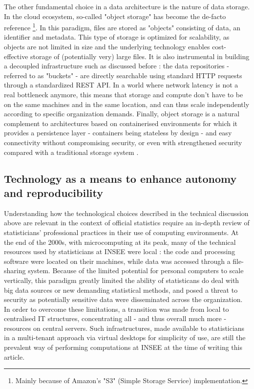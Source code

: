 
The other fundamental choice in a data architecture is the nature of data storage. In the cloud ecosystem, so-called "object storage" has become the de-facto reference \cite{samundiswary2017object} \footnote{Mainly because of Amazon's "S3" (Simple Storage Service) implementation.}. In this paradigm, files are stored as "objects" consisting of data, an identifier and metadata. This type of storage is optimized for scalability, as objects are not limited in size and the underlying technology enables cost-effective storage of (potentially very) large files. It is also instrumental in building a decoupled infrastructure such as discussed before : the data repositories - referred to as "buckets" - are directly searchable using standard HTTP requests through a standardized REST API. In a world where network latency is not a real bottleneck anymore, this means that storage and compute don't have to be on the same machines and in the same location, and can thus scale independently according to specific organization demands. Finally, object storage is a natural complement to architectures based on containerised environments for which it provides a persistence layer - containers being stateless by design - and easy connectivity without compromising security, or even with strengthened security compared with a traditional storage system \cite{mesnier2003object}.

\subsection{Technology as a means to enhance autonomy and reproducibility}

Understanding how the technological choices described in the technical discussion above are relevant in the context of official statistics require an in-depth review of statisticians’ professional practices in their use of computing environments. At the end of the 2000s, with microcomputing at its peak, many of the technical resources used by statisticians at INSEE were local : the code and processing software were located on their machines, while data was accessed through a file-sharing system. Because of the limited potential for personal computers to scale vertically, this paradigm greatly limited the ability of statisticans do deal with big data sources or new demanding statistical methods, and posed a threat to security as potentially sensitive data were disseminated across the organization. In order to overcome these limitations, a transition was made from local to centralised IT structures, concentrating all - and thus overall much more - resources on central servers. Such infrastructures, made available to statisticians in a multi-tenant approach via virtual desktops for simplicity of use, are still the prevalent way of performing computations at INSEE at the time of writing this article.

